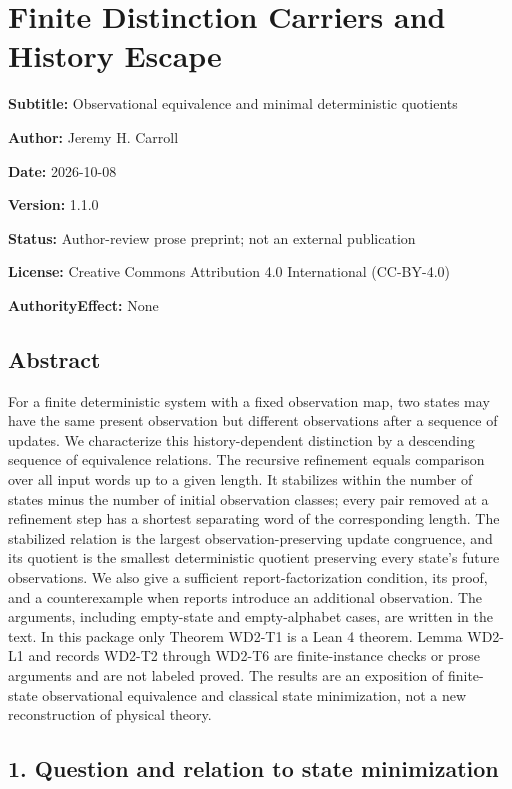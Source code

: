 \documentclass[
  11pt,
]{article}
\author{}
\date{}
\begin{document}
\section{Finite Distinction Carriers and History
Escape}\label{finite-distinction-carriers-and-history-escape}

\textbf{Subtitle:} Observational equivalence and minimal deterministic
quotients

\textbf{Author:} Jeremy H. Carroll

\textbf{Date:} 2026-10-08

\textbf{Version:} 1.1.0

\textbf{Status:} Author-review prose preprint; not an external
publication

\textbf{License:} Creative Commons Attribution 4.0 International
(CC-BY-4.0)

\textbf{AuthorityEffect:} None

\subsection{Abstract}\label{abstract}

For a finite deterministic system with a fixed observation map, two
states may have the same present observation but different observations
after a sequence of updates. We characterize this history-dependent
distinction by a descending sequence of equivalence relations. The
recursive refinement equals comparison over all input words up to a
given length. It stabilizes within the number of states minus the number
of initial observation classes; every pair removed at a refinement step
has a shortest separating word of the corresponding length. The
stabilized relation is the largest observation-preserving update
congruence, and its quotient is the smallest deterministic quotient
preserving every state's future observations. We also give a sufficient
report-factorization condition, its proof, and a counterexample when
reports introduce an additional observation. The arguments, including
empty-state and empty-alphabet cases, are written in the text. In this
package only Theorem WD2-T1 is a Lean 4 theorem. Lemma WD2-L1 and
records WD2-T2 through WD2-T6 are finite-instance checks or prose
arguments and are not labeled proved. The results are an exposition of
finite-state observational equivalence and classical state minimization,
not a new reconstruction of physical theory.

\subsection{1. Question and relation to state
minimization}\label{question-and-relation-to-state-minimization}
\end{document}
